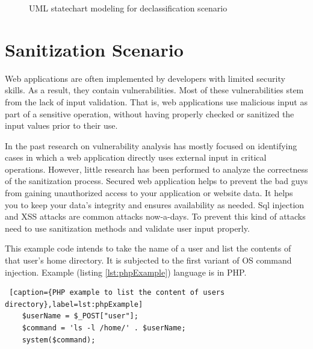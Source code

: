 \begin{figure}[htbp]
	\centering
	\label{fig:declassification_scenario}
	\caption{UML statechart modeling for declassification scenario}
\end{figure}


\section{Sanitization Scenario}
Web applications are often implemented by developers with limited security skills. As a result, they
contain vulnerabilities. Most of these vulnerabilities stem
from the lack of input validation. That is, web applications
use malicious input as part of a sensitive operation, without having properly checked or sanitized the input values
prior to their use.

In the past research on vulnerability analysis has mostly focused on identifying cases in which a web application directly uses external input in critical operations. However,
little research has been performed to analyze the correctness of the sanitization process. Secured web application helps to prevent the bad guys from gaining unauthorized access to your application or website data. It helps you to keep your data's integrity and ensures availability as needed. Sql injection and XSS attacks are common attacks now-a-days. To prevent this kind of attacks need to use sanitization methods and validate user input properly.

This example code intends to take the name of a user and list the contents of that user's home directory. It is subjected to the first variant of OS command injection. Example (listing \ref{lst:phpExample}) language is in PHP.

\begin{lstlisting} [caption={PHP example to list the content of users directory},label=lst:phpExample]
	$userName = $_POST["user"];
	$command = 'ls -l /home/' . $userName;
	system($command);
\end{lstlisting} 

